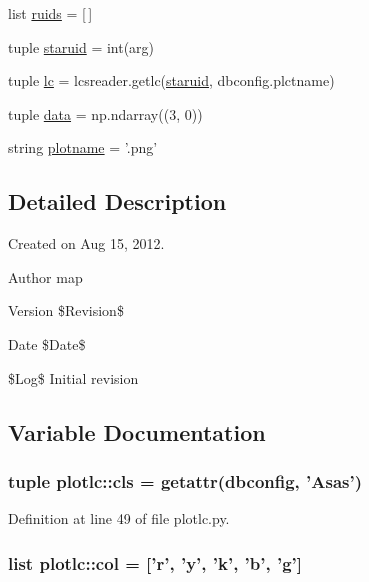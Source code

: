 \begin{DoxyCompactItemize}
list \hyperlink{namespaceplotlc_ac4ddf97fd899d00422bd2044f1695339}{ruids} = \mbox{[}$\,$\mbox{]}
\item 
tuple \hyperlink{namespaceplotlc_a0f4044b7c539ef06d771594b766ca44b}{staruid} = int(arg)
\item 
tuple \hyperlink{namespaceplotlc_abfc0239bb4b4ca08e710d0fc52097ddd}{lc} = lcsreader.getlc(\hyperlink{namespaceplotlc_a0f4044b7c539ef06d771594b766ca44b}{staruid}, dbconfig.plctname)
\item 
tuple \hyperlink{namespaceplotlc_a4a20eb1a28e7335a93020398cadede85}{data} = np.ndarray((3, 0))
\item 
string \hyperlink{namespaceplotlc_ac18e7742b8c5f7d21a2efe570d6e2baa}{plotname} = '.png'
\end{DoxyCompactItemize}


\subsection{Detailed Description}
Created on Aug 15, 2012. \begin{DoxyAuthor}{Author}
map 
\end{DoxyAuthor}
\begin{DoxyVersion}{Version}
\$Revision\$ 
\end{DoxyVersion}
\begin{DoxyDate}{Date}
\$Date\$
\end{DoxyDate}
\$Log\$ Initial revision 

\subsection{Variable Documentation}
\hypertarget{namespaceplotlc_aa0d67ca52f94cf7df7e8d42908675f95}{
\subsubsection[{cls}]{\setlength{\rightskip}{0pt plus 5cm}tuple {\bf plotlc::cls} = getattr({\bf dbconfig}, 'Asas')}}
\label{namespaceplotlc_aa0d67ca52f94cf7df7e8d42908675f95}


Definition at line 49 of file plotlc.py.

\hypertarget{namespaceplotlc_a1a420be8a418faa806bb3f235a64b7b4}{
\subsubsection[{col}]{\setlength{\rightskip}{0pt plus 5cm}list {\bf plotlc::col} = \mbox{[}'r', 'y', 'k', 'b', 'g'\mbox{]}}}
\label{namespaceplotlc_a1a420be8a418faa806bb3f235a64b7b4}


